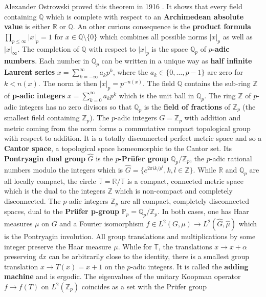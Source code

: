 \documentclass[12pt]{amsart}
\begin{document}
Alexander Ostrowski proved this theorem in 1916 \cite{Ostrowski1916}.
It shows that every field containing $\mathbb{Q}$ which is complete with respect to an
{\bf Archimedean absolute value} is either $\mathbb{R}$ or $\mathbb{Q}$. An other curious consequence is
the {\bf product formula} $\prod_{p \leq \infty} |x|_p = 1$ for $x \in \mathbb{Q} \setminus \{0\}$
which combines all possible norms $|x|_p$ as well as $|x|_{\infty}$. The completion of $\mathbb{Q}$
with respect to $|x|_p$ is the space $\mathbb{Q}_p$ of {\bf $p$-adic numbers}. Each number in $\mathbb{Q}_p$ 
can be written in a unique way as {\bf half infinite Laurent series} $x = \sum_{k={-\infty}}^{\infty} a_k p^k$,
where the $a_k \in \{0,\dots,p-1\}$ are zero for $k < n(x)$. The norm is then $|x|_p=p^{-n(x)}$.
The field $\mathbb{Q}$ contains the sub-ring $\mathbb{Z}$ of {\bf p-adic integers}
$x = \sum_{k=0}^{\infty} a_k p^k$ which is the unit ball in $\mathbb{Q}_p$.
The ring $\mathbb{Z}$ of $p$-adic integers has no zero divisors so that
$\mathbb{Q}_p$ is the {\bf field of fractions} of $\mathbb{Z}_p$ (the smallest field containing $\mathbb{Z}_p$).
The $p$-adic integers $G=\mathbb{Z}_p$ with addition and metric coming from the norm
forms a commutative compact topological group with respect to addition. It is a totally disconnected
perfect metric space and so a {\bf Cantor space}, a topological space homeomorphic to the Cantor set.
Its {\bf Pontryagin dual group} $\hat{G}$ is the {\bf $p$-Pr\"ufer group} $\mathbb{Q}_p/\mathbb{Z}_p$,
the $p$-adic rational numbers modulo the integers which is
$\hat{G} = \{ e^{2\pi i k/p^l}, k,l \in \mathbb{Z} \}$.
While $\mathbb{R}$ and $\mathbb{Q}_p$ are all locally compact, 
the circle $\mathbb{T}=\mathbb{R}/\mathbb{T}$ is a compact, connected metric space which is the dual to
the integers $\mathbb{Z}$ which is non-compact and completely disconnected. The
$p$-adic integers $\mathbb{Z}_p$ are all compact, completely disconnected spaces, dual to
the {\bf Pr\"ufer p-group} $\mathbb{P}_p=\mathbb{Q}_p/\mathbb{Z}_p$.
In both cases, one has Haar measures $\mu$ on $G$ and a Fourier
isomorphism $f \in L^2(G,\mu) \to L^2(\hat{G},\hat{\mu})$ which is the Pontryagin involution.
All group translations and multiplications by some integer preserve the Haar measure $\mu$. While for $\mathbb{T}$,
the translations $x \to x+\alpha$ preserving $dx$ can be arbitrarily close to the identity, there is a smallest group translation
$x \to T(x)=x+1$ on the $p$-adic integers. It is called the {\bf adding machine} and is ergodic. The eigenvalues
of the unitary Koopman operator $f \to f(T)$ on $L^2(\mathbb{Z}_p)$ coincides as a set with the Pr\"ufer group
\end{document}
